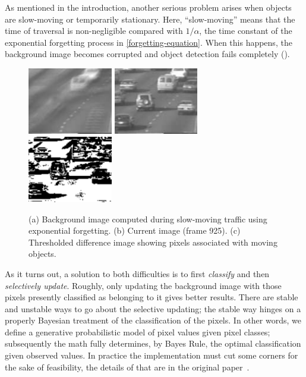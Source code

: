 As mentioned in the introduction, another serious problem arises when
objects are slow-moving or temporarily stationary. Here, ``slow-moving''
means that the time of
traversal is non-negligible compared with $1/\alpha$,
the time constant of the exponential forgetting process in
\eqref{forgetting-equation}. When this happens,
the background image becomes corrupted and object detection fails
completely ().

\begin{figure}[t]
  \includegraphics[width=0.33\textwidth]{figures/avg_0924.pdf}
  \includegraphics[width=0.33\textwidth]{figures/img_0925.pdf}
  \includegraphics[width=0.33\textwidth]{figures/mask_0925.pdf}
\caption{(a) Background image computed during slow-moving traffic
using exponential forgetting. (b) Current image (frame 925). (c) Thresholded
difference image showing pixels associated with moving objects.}
\label{slow-traffic-figure}
\end{figure}


As it turns out, a solution to both difficulties is to first
\emph{classify} and then \emph{selectively update}.  Roughly, only
updating the background image with those pixels presently classified as
belonging to it gives better results.  There are stable and
unstable ways to go about the selective updating; the stable way
hinges on a properly Bayesian treatment of the classification of the
pixels.  In other words, we define a generative
probabilistic model of pixel values given pixel classes; subsequently
the math fully determines, by Bayes Rule, the optimal classification
given observed values.  In practice the implementation must
cut some corners for the sake of feasibility, the details of that are
in the original paper~\cite{friedman1997image}. 




